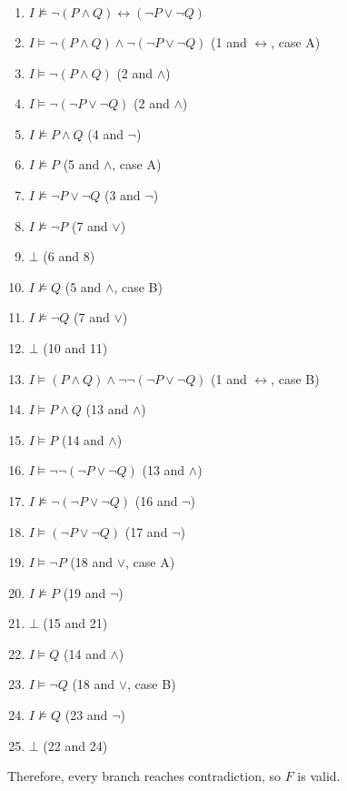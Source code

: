 \documentclass[11pt,a4paper]{article}
\newcommand{\lequiv}{\leftrightarrow}
\begin{document}
\begin{solution}
    \begin{enumerate}
    	\item $I \not\models \lnot(P \land Q) \lequiv (\lnot P \lor \lnot Q)$
    	\item $I \models \lnot(P \land Q) \land \lnot (\lnot P \lor \lnot Q) $ (1 and $\lequiv$, case A)
    	\item $I \models \lnot(P \land Q)$ (2 and $\land$)
    	\item $I \models \lnot (\lnot P \lor \lnot Q)$ (2 and $\land$)
    	\item $I \not\models P \land Q$ (4 and $\lnot$)
    	\item $I \not\models P$ (5 and $\land$, case A)
    	\item $I \not\models \lnot P \lor \lnot Q$ (3 and $\lnot$)
    	\item $I \not\models \lnot P$ (7 and $\lor$)
    	\item $\bot$ (6 and 8)
    	\item $I \not\models Q$ (5 and $\land$, case B)
    	\item $I \not\models \lnot Q$ (7 and $\lor$)
    	\item $\bot$ (10 and 11)
    	\item $I \models (P \land Q) \land \lnot \lnot (\lnot P \lor \lnot Q) $ (1 and $\lequiv$, case B)
    	\item $I \models P \land Q$ (13 and $\land$)
    	\item $I \models P$ (14 and $\land$)
    	\item $I \models \lnot \lnot (\lnot P \lor \lnot Q)$ (13 and $\land$)
    	\item $I \not\models \lnot (\lnot P \lor \lnot Q)$ (16 and $\lnot$)
    	\item $I \models (\lnot P \lor \lnot Q)$ (17 and $\lnot$)
    	\item $I \models \lnot P$ (18 and $\lor$, case A)
    	\item $I \not\models P$ (19 and $\lnot$)
    	\item $\bot$ (15 and 21)
    	\item $I \models Q$ (14 and $\land$)
    	\item $I \models \lnot Q$ (18 and $\lor$, case B)
    	\item $I \not\models Q$ (23 and $\lnot$)
    	\item $\bot$ (22 and 24)
    \end{enumerate}

	Therefore, every branch reaches contradiction, so $F$ is valid.
\end{solution}
\end{document}
